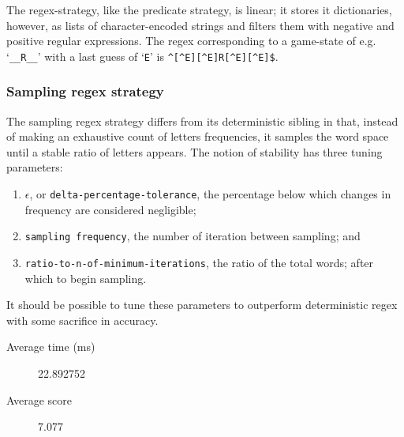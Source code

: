 \documentclass{article}
\begin{document}
The regex-strategy, like the predicate strategy, is linear; it stores
it dictionaries, however, as lists of character-encoded strings %
and filters them with negative and positive regular expressions. The
regex corresponding to a game-state of e.g. `\texttt{\_\_R\_\_}' with
a last guess of `\texttt{E}' is
\texttt{\^{}[\^{}E][\^{}E]R[\^{}E][\^{}E]\$}.

\subsubsection{Sampling regex strategy}

The sampling regex strategy differs from its deterministic sibling in
that, instead of making an exhaustive count of letters frequencies, it
samples the word space until a stable ratio of letters appears. The
notion of stability has three tuning parameters:

\begin{enumerate}
\item $\epsilon$, or \texttt{delta-percentage-tolerance}, the
  percentage below which changes in frequency are considered
  negligible;
\item \texttt{sampling frequency}, the number of iteration between
  sampling; and
\item \texttt{ratio-to-n-of-minimum-iterations}, the ratio of the
  total words; after which to begin sampling.
\end{enumerate}

It should be possible to tune these parameters to outperform
deterministic regex with some sacrifice in accuracy.

\begin{description}
  \item [Average time (ms)] 22.892752
  \item [Average score] 7.077
\end{description}

\end{document}
